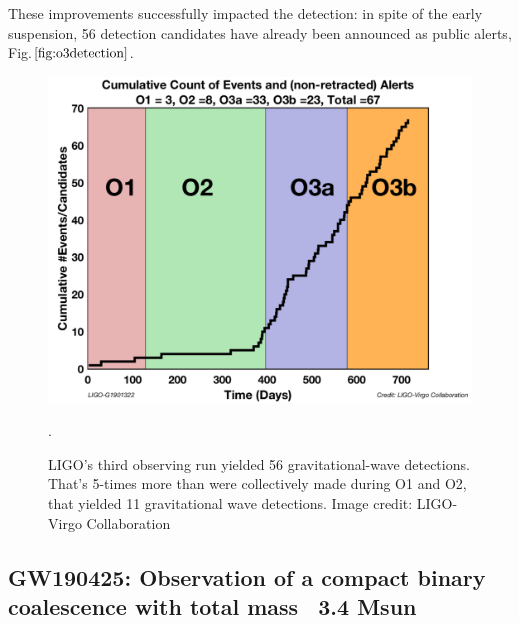 \documentclass[binding=0.6cm, LaM]{sapthesis}
\begin{document}
	These improvements successfully impacted the detection: in spite of the early suspension, 
	56 detection candidates have already been announced as public alerts, Fig.$\ref{fig:o3detection}$.
                \begin{figure}[H]
                        \label{o3detection}
                        \includegraphics[scale=0.22]{o3detection}
                        \centering
                        \caption{LIGO's third observing run yielded 56 gravitational-wave detections. That's 5-times more than were collectively made during O1 and O2, that yielded 11 gravitational wave detections. Image credit: LIGO-Virgo Collaboration}. 
                        \label{fig:o3detection}
                \end{figure}

\subsection{GW190425: Observation of a compact binary coalescence with total mass ~3.4 Msun}
\end{document}
